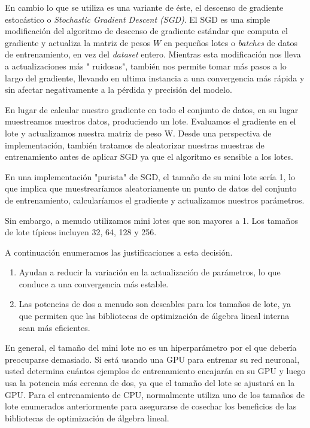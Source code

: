 \documentclass[a4paper,12pt]{article}
\begin{document}
En cambio lo que se utiliza es una variante de éste, el descenso de gradiente estocástico o \textit{Stochastic Gradient Descent (SGD)}.
El SGD es una simple modificación del algoritmo de descenso de gradiente estándar que computa el gradiente y actualiza la matriz de pesos $W$ en pequeños lotes o \textit{batches} de datos de entrenamiento, en vez del \textit{dataset} entero. Mientras esta modificación nos lleva a actualizaciones más " ruidosas", también nos permite tomar más pasos a lo largo del gradiente, llevando en ultima instancia a una convergencia más rápida y sin afectar negativamente a la pérdida y precisión del modelo.

En lugar de calcular nuestro gradiente en todo el conjunto de datos, en su lugar muestreamos nuestros datos, produciendo un lote. Evaluamos el gradiente en el lote y actualizamos nuestra matriz de peso W. Desde una perspectiva de implementación, también tratamos de aleatorizar nuestras muestras de entrenamiento antes de aplicar SGD ya que el algoritmo es sensible a los lotes.

En una implementación "purista" de SGD, el tamaño de su mini lote sería 1, lo que implica que muestrearíamos aleatoriamente un punto de datos del conjunto de entrenamiento, calcularíamos el gradiente
y actualizamos nuestros parámetros.

Sin embargo, a menudo utilizamos mini lotes que son mayores a 1. Los tamaños de lote típicos incluyen 32, 64, 128 y 256.

A continuación enumeramos las justificaciones a esta decisión.

\begin{enumerate}
\item Ayudan a reducir la variación en la actualización de parámetros, lo que conduce a una convergencia más estable. 
\item Las potencias de dos a menudo son deseables para los tamaños de lote, ya que permiten que las bibliotecas de optimización de álgebra lineal interna sean más eficientes.
\end{enumerate}
En general, el tamaño del mini lote no es un hiperparámetro por el que debería preocuparse demasiado. Si está usando una GPU para entrenar su red neuronal, usted determina cuántos ejemplos de entrenamiento encajarán en su GPU y luego usa la potencia más cercana de dos, ya que el tamaño del lote se ajustará en la GPU. Para el entrenamiento de CPU, normalmente utiliza uno de los tamaños de lote enumerados anteriormente para asegurarse de cosechar los beneficios de las bibliotecas de optimización de álgebra lineal.
\end{document}
